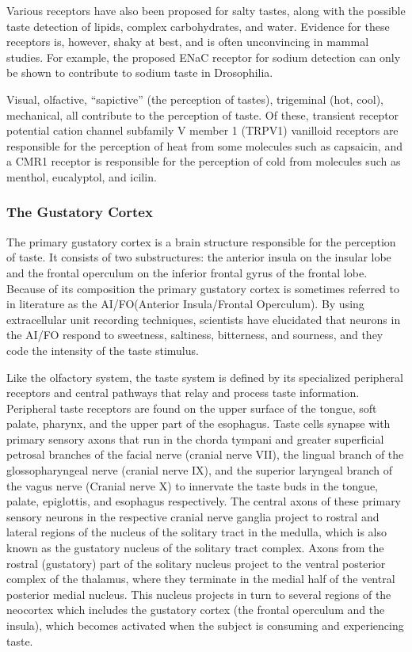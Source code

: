 Various receptors have also been proposed for salty tastes, along with
the possible taste detection of lipids, complex carbohydrates, and
water. Evidence for these receptors is, however, shaky at best, and is
often unconvincing in mammal studies. For example, the proposed ENaC
receptor for sodium detection can only be shown to contribute to sodium
taste in Drosophilia.

Visual, olfactive, ``sapictive'' (the perception of tastes), trigeminal
(hot, cool), mechanical, all contribute to the perception of taste. Of
these, transient receptor potential cation channel subfamily V member 1
(TRPV1) vanilloid receptors are responsible for the perception of heat
from some molecules such as capsaicin, and a CMR1 receptor is
responsible for the perception of cold from molecules such as menthol,
eucalyptol, and icilin.

\hypertarget{the-gustatory-cortex}{%
\subsubsection{The Gustatory Cortex}\label{the-gustatory-cortex}}

The primary gustatory cortex is a brain structure responsible for the
perception of taste. It consists of two substructures: the anterior
insula on the insular lobe and the frontal operculum on the inferior
frontal gyrus of the frontal lobe. Because of its composition the
primary gustatory cortex is sometimes referred to in literature as the
AI/FO(Anterior Insula/Frontal Operculum). By using extracellular unit
recording techniques, scientists have elucidated that neurons in the
AI/FO respond to sweetness, saltiness, bitterness, and sourness, and
they code the intensity of the taste stimulus.

Like the olfactory system, the taste system is defined by its
specialized peripheral receptors and central pathways that relay and
process taste information. Peripheral taste receptors are found on the
upper surface of the tongue, soft palate, pharynx, and the upper part of
the esophagus. Taste cells synapse with primary sensory axons that run
in the chorda tympani and greater superficial petrosal branches of the
facial nerve (cranial nerve VII), the lingual branch of the
glossopharyngeal nerve (cranial nerve IX), and the superior laryngeal
branch of the vagus nerve (Cranial nerve X) to innervate the taste buds
in the tongue, palate, epiglottis, and esophagus respectively. The
central axons of these primary sensory neurons in the respective cranial
nerve ganglia project to rostral and lateral regions of the nucleus of
the solitary tract in the medulla, which is also known as the gustatory
nucleus of the solitary tract complex. Axons from the rostral
(gustatory) part of the solitary nucleus project to the ventral
posterior complex of the thalamus, where they terminate in the medial
half of the ventral posterior medial nucleus. This nucleus projects in
turn to several regions of the neocortex which includes the gustatory
cortex (the frontal operculum and the insula), which becomes activated
when the subject is consuming and experiencing taste.
